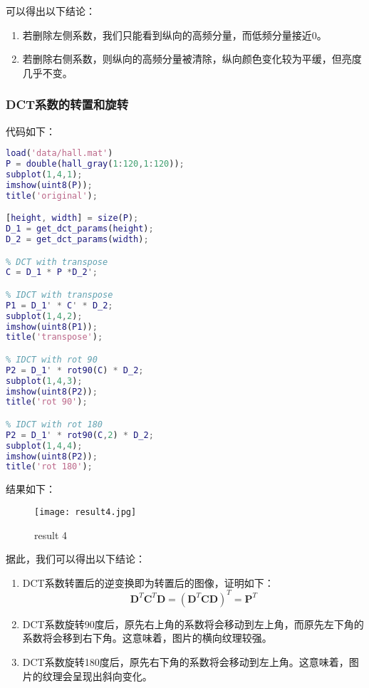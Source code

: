 \documentclass[a4paper]{article}
\begin{document}
\par 可以得出以下结论：
\begin{enumerate}
    \item 若删除左侧系数，我们只能看到纵向的高频分量，而低频分量接近0。
    \item 若删除右侧系数，则纵向的高频分量被清除，纵向颜色变化较为平缓，但亮度几乎不变。
\end{enumerate}

\subsubsection{DCT系数的转置和旋转}
\par 代码如下：
\begin{lstlisting}[language=matlab, caption=DCT系数的转置和旋转]
load('data/hall.mat')
P = double(hall_gray(1:120,1:120));
subplot(1,4,1);
imshow(uint8(P));
title('original');

[height, width] = size(P);
D_1 = get_dct_params(height);
D_2 = get_dct_params(width);

% DCT with transpose
C = D_1 * P *D_2';

% IDCT with transpose
P1 = D_1' * C' * D_2;
subplot(1,4,2);
imshow(uint8(P1));
title('transpose');

% IDCT with rot 90
P2 = D_1' * rot90(C) * D_2;
subplot(1,4,3);
imshow(uint8(P2));
title('rot 90');

% IDCT with rot 180
P2 = D_1' * rot90(C,2) * D_2;
subplot(1,4,4);
imshow(uint8(P2));
title('rot 180');

\end{lstlisting}

\par 结果如下：
\begin{figure}[ht]
     \centering
     \texttt{[image: result4.jpg]}
     \caption{result 4}
    \label{fig:result 4}
\end{figure}

\par 据此，我们可以得出以下结论：
\begin{enumerate}
    \item DCT系数转置后的逆变换即为转置后的图像，证明如下：
    \begin{equation}
        \mathbf{D}^T\mathbf{C}^T\mathbf{D} = (\mathbf{D}^T\mathbf{C}\mathbf{D})^T = \mathbf{P}^T
    \end{equation}
    \item DCT系数旋转90度后，原先右上角的系数将会移动到左上角，而原先左下角的系数将会移到右下角。这意味着，图片的横向纹理较强。
    \item DCT系数旋转180度后，原先右下角的系数将会移动到左上角。这意味着，图片的纹理会呈现出斜向变化。
\end{enumerate}
\end{document}

